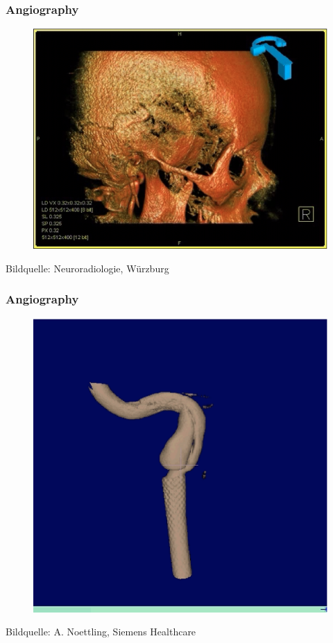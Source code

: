 \begin{frame}
	\frametitle{Angiography}
	\begin{figure}
		\includegraphics[height=.8\textheight]{Bilder/angio7}
	\end{figure}
	\hspace*{.4cm}  \tiny Bildquelle: Neuroradiologie, Würzburg
\end{frame}

\begin{frame}
	\frametitle{Angiography}
	\begin{figure}
		\includegraphics[height=.8\textheight]{Bilder/angio8}
	\end{figure}
	\hspace*{.4cm}  \tiny Bildquelle: A. Noettling, Siemens Healthcare
\end{frame}



